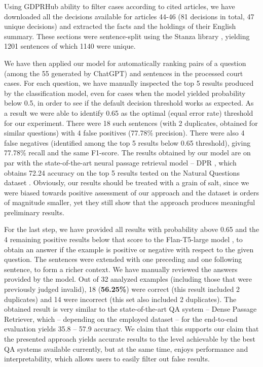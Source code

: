 Using GDPRHub ability to filter cases according to cited articles, we have downloaded all the decisions available for articles 44-46 (81 decisions in total, 47 unique decisions) and extracted the facts and the holdings of their English 
summary. These sections were sentence-split using the Stanza library \cite{qi2020stanza}, yielding 1201 sentences
of which 1140 were unique. 

We have then applied our model for automatically ranking pairs of a question (among the 55 generated by ChatGPT) and sentences in the processed court cases.
For each question, we have manually inspected the top 5 results
produced by the classification model, even for cases when the model yielded probability below 0.5, in order to see if the default
decision threshold works as expected. As a result we were able to identify 0.65 as the optimal (equal error rate) threshold for our 
experiment. There were 18 such sentences (with 2 duplicates, obtained for similar questions) with 4 false positives (77.78\% precision).
There were also 4 false negatives (identified among the top 5 results below 0.65 threshold), giving 77.78\% recall and the same F1-score. 
The results obtained by our model are on par with the state-of-the-art neural passage retrieval model -- DPR \cite{karpukhin2020dense},
which obtains 72.24 accuracy on the top 5 results tested on the Natural Questions dataset \cite{kwiatkowski2019natural}. Obviously, 
our results should be treated with a grain of salt, since we were biased towards positive assessment of our approach and the 
dataset is orders of magnitude smaller, yet they still show that the approach produces meaningful preliminary results.

For the last step, we have provided all results with probability above 0.65 and the 4 remaining positive results below that score
to the Flan-T5-large model \cite{wei2021finetuned,raffel2020exploring}, to obtain an answer if the example is positive or negative
with respect to the given question. The sentences were extended with one preceding and one following sentence, to form a richer context.
We have manually reviewed the answers provided by the model. Out of 32 analyzed examples (including those  
that were previously judged invalid), 18 (\textbf{56.25\%}) were correct (this result included 2 duplicates) and 14 were incorrect (this set
also included 2 duplicates). The obtained result is very similar to the state-of-the-art QA system -- Dense Passage Retriever,
which -- depending on the employed dataset -- for the end-to-end evaluation yields 35.8 -- 57.9 accuracy. We claim that this 
supports our claim that the presented approach yields accurate results to the level achievable by the best QA systems 
available currently, but at the same time, enjoys performance and interpretability, which allows users to easily filter out false results.

